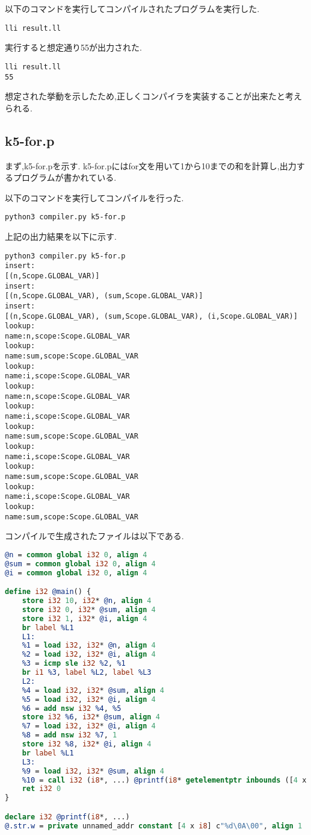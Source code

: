 \documentclass[main]{subfiles}
\begin{document}
以下のコマンドを実行してコンパイルされたプログラムを実行した.
\begin{oframed}
\begin{verbatim}
lli result.ll
\end{verbatim}
\end{oframed}
実行すると想定通り55が出力された.
\begin{lstlisting}[caption=k5-if1.pをコンパイルしたプログラムを実行]
lli result.ll
55
\end{lstlisting}
想定された挙動を示したため,正しくコンパイラを実装することが出来たと考えられる.

\subsection{k5-for.p}
まず,k5-for.pを示す.
k5-for.pにはfor文を用いて1から10までの和を計算し,出力するプログラムが書かれている.

以下のコマンドを実行してコンパイルを行った.
\begin{oframed}
\begin{verbatim}
python3 compiler.py k5-for.p
\end{verbatim}
\end{oframed}
上記の出力結果を以下に示す.
\begin{lstlisting}[caption=python3 compiler.py k5-for.pの出力]
python3 compiler.py k5-for.p
insert:
[(n,Scope.GLOBAL_VAR)]
insert:
[(n,Scope.GLOBAL_VAR), (sum,Scope.GLOBAL_VAR)]
insert:
[(n,Scope.GLOBAL_VAR), (sum,Scope.GLOBAL_VAR), (i,Scope.GLOBAL_VAR)]
lookup:
name:n,scope:Scope.GLOBAL_VAR
lookup:
name:sum,scope:Scope.GLOBAL_VAR
lookup:
name:i,scope:Scope.GLOBAL_VAR
lookup:
name:n,scope:Scope.GLOBAL_VAR
lookup:
name:i,scope:Scope.GLOBAL_VAR
lookup:
name:sum,scope:Scope.GLOBAL_VAR
lookup:
name:i,scope:Scope.GLOBAL_VAR
lookup:
name:sum,scope:Scope.GLOBAL_VAR
lookup:
name:i,scope:Scope.GLOBAL_VAR
lookup:
name:sum,scope:Scope.GLOBAL_VAR
\end{lstlisting}
コンパイルで生成されたファイルは以下である.
\begin{lstlisting}[caption=k5-for.pのコンパイルで生成されたresult.ll,language=LLVM]
@n = common global i32 0, align 4
@sum = common global i32 0, align 4
@i = common global i32 0, align 4

define i32 @main() {
    store i32 10, i32* @n, align 4
    store i32 0, i32* @sum, align 4
    store i32 1, i32* @i, align 4
    br label %L1
    L1:
    %1 = load i32, i32* @n, align 4
    %2 = load i32, i32* @i, align 4
    %3 = icmp sle i32 %2, %1
    br i1 %3, label %L2, label %L3
    L2:
    %4 = load i32, i32* @sum, align 4
    %5 = load i32, i32* @i, align 4
    %6 = add nsw i32 %4, %5
    store i32 %6, i32* @sum, align 4
    %7 = load i32, i32* @i, align 4
    %8 = add nsw i32 %7, 1
    store i32 %8, i32* @i, align 4
    br label %L1
    L3:
    %9 = load i32, i32* @sum, align 4
    %10 = call i32 (i8*, ...) @printf(i8* getelementptr inbounds ([4 x i8], [4 x i8]* @.str.w, i64 0, i64 0), i32 %9)
    ret i32 0
}

declare i32 @printf(i8*, ...)
@.str.w = private unnamed_addr constant [4 x i8] c"%d\0A\00", align 1
\end{lstlisting}
\end{document}
